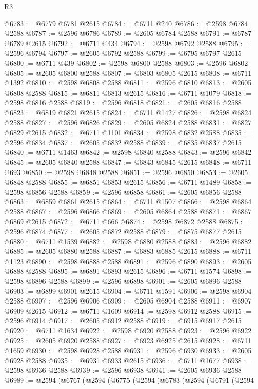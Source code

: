 \begin{lexlean}{R3}
\begin{coremodule}
@6783 := @6779 @6781 @2615
@6784 := @6711 @240
@6786 := @2598 @6784 @2588
@6787 := @2596 @6786
@6789 := @2605 @6784 @2588
@6791 := @6787 @6789 @2615
@6792 := @6711 @434
@6794 := @2598 @6792 @2588
@6795 := @2596 @6794
@6797 := @2605 @6792 @2588
@6799 := @6795 @6797 @2615
@6800 := @6711 @439
@6802 := @2598 @6800 @2588
@6803 := @2596 @6802
@6805 := @2605 @6800 @2588
@6807 := @6803 @6805 @2615
@6808 := @6711 @1392
@6810 := @2598 @6808 @2588
@6811 := @2596 @6810
@6813 := @2605 @6808 @2588
@6815 := @6811 @6813 @2615
@6816 := @6711 @1079
@6818 := @2598 @6816 @2588
@6819 := @2596 @6818
@6821 := @2605 @6816 @2588
@6823 := @6819 @6821 @2615
@6824 := @6711 @1427
@6826 := @2598 @6824 @2588
@6827 := @2596 @6826
@6829 := @2605 @6824 @2588
@6831 := @6827 @6829 @2615
@6832 := @6711 @1101
@6834 := @2598 @6832 @2588
@6835 := @2596 @6834
@6837 := @2605 @6832 @2588
@6839 := @6835 @6837 @2615
@6840 := @6711 @1463
@6842 := @2598 @6840 @2588
@6843 := @2596 @6842
@6845 := @2605 @6840 @2588
@6847 := @6843 @6845 @2615
@6848 := @6711 @693
@6850 := @2598 @6848 @2588
@6851 := @2596 @6850
@6853 := @2605 @6848 @2588
@6855 := @6851 @6853 @2615
@6856 := @6711 @1489
@6858 := @2598 @6856 @2588
@6859 := @2596 @6858
@6861 := @2605 @6856 @2588
@6863 := @6859 @6861 @2615
@6864 := @6711 @1507
@6866 := @2598 @6864 @2588
@6867 := @2596 @6866
@6869 := @2605 @6864 @2588
@6871 := @6867 @6869 @2615
@6872 := @6711 @666
@6874 := @2598 @6872 @2588
@6875 := @2596 @6874
@6877 := @2605 @6872 @2588
@6879 := @6875 @6877 @2615
@6880 := @6711 @1539
@6882 := @2598 @6880 @2588
@6883 := @2596 @6882
@6885 := @2605 @6880 @2588
@6887 := @6883 @6885 @2615
@6888 := @6711 @1123
@6890 := @2598 @6888 @2588
@6891 := @2596 @6890
@6893 := @2605 @6888 @2588
@6895 := @6891 @6893 @2615
@6896 := @6711 @1574
@6898 := @2598 @6896 @2588
@6899 := @2596 @6898
@6901 := @2605 @6896 @2588
@6903 := @6899 @6901 @2615
@6904 := @6711 @1591
@6906 := @2598 @6904 @2588
@6907 := @2596 @6906
@6909 := @2605 @6904 @2588
@6911 := @6907 @6909 @2615
@6912 := @6711 @1609
@6914 := @2598 @6912 @2588
@6915 := @2596 @6914
@6917 := @2605 @6912 @2588
@6919 := @6915 @6917 @2615
@6920 := @6711 @1634
@6922 := @2598 @6920 @2588
@6923 := @2596 @6922
@6925 := @2605 @6920 @2588
@6927 := @6923 @6925 @2615
@6928 := @6711 @1659
@6930 := @2598 @6928 @2588
@6931 := @2596 @6930
@6933 := @2605 @6928 @2588
@6935 := @6931 @6933 @2615
@6936 := @6711 @1677
@6938 := @2598 @6936 @2588
@6939 := @2596 @6938
@6941 := @2605 @6936 @2588
@6989 := @2594
    (@6767
      (@2594
        (@6775
          (@2594
            (@6783
              (@2594
                (@6791
                  (@2594

\end{coremodule}
\end{lexlean}

